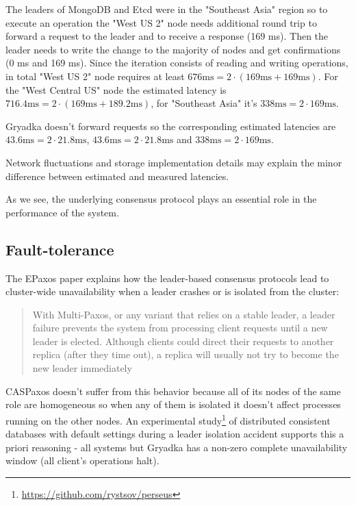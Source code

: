 \documentclass[a4paper,USenglish]{lipics-v2018}
\theoremstyle{definition}
\begin{document}
The leaders of MongoDB and Etcd were in the "Southeast Asia" region so to execute an operation the "West US 2" node needs additional round trip to forward a request to the leader and to receive a response (169 ms). Then the leader needs to write the change to the majority of nodes and get confirmations (0 ms and 169 ms). Since the iteration consists of reading and writing operations, in total "West US 2" node requires at least $676 \mbox{ms} = 2 \cdot (169 \mbox{ms} + 169 \mbox{ms})$. For the "West Central US" node the estimated latency is $716.4 \mbox{ms} = 2 \cdot (169 \mbox{ms} + 189.2 \mbox{ms})$, for "Southeast Asia" it's $338 \mbox{ms} = 2 \cdot 169 \mbox{ms}$.

Gryadka doesn't forward requests so the corresponding estimated latencies are $43.6 \mbox{ms} = 2 \cdot 21.8 \mbox{ms}$, $43.6 \mbox{ms} = 2 \cdot 21.8 \mbox{ms}$ and $338 \mbox{ms} = 2 \cdot 169 \mbox{ms}$.

Network fluctuations and storage implementation details may explain the minor difference between estimated and measured latencies.

As we see, the underlying consensus protocol plays an essential role in the performance of the system.

\subsection{Fault-tolerance}

The EPaxos paper explains how the leader-based consensus protocols lead to cluster-wide unavailability when a leader crashes or is isolated from the cluster:

\begin{quote}
  With Multi-Paxos, or any variant that relies on a stable leader, a leader failure prevents the system from processing client requests until a new leader is elected. Although clients could direct their requests to another replica (after they time out), a replica will usually not try to become the new leader immediately
\end{quote}

CASPaxos doesn't suffer from this behavior because all of its nodes of the same role are homogeneous so when any of them is isolated it doesn't affect processes running on the other nodes. An experimental study\footnote{\href{https://github.com/rystsov/perseus}{https://github.com/rystsov/perseus}} of distributed consistent databases with default settings during a leader isolation accident supports this a priori reasoning - all systems but Gryadka has a non-zero complete unavailability window (all client's operations halt).
\end{document}
